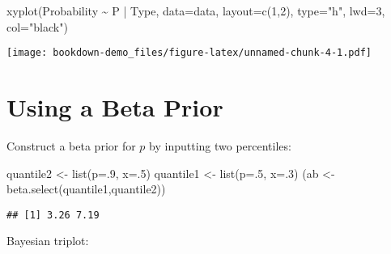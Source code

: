\documentclass[
]{book}
\newenvironment{Shaded}{\begin{snugshade}}{\end{snugshade}}
\newcommand{\AttributeTok}[1]{\textcolor[rgb]{0.77,0.63,0.00}{#1}}
\newcommand{\DecValTok}[1]{\textcolor[rgb]{0.00,0.00,0.81}{#1}}
\newcommand{\FunctionTok}[1]{\textcolor[rgb]{0.00,0.00,0.00}{#1}}
\newcommand{\NormalTok}[1]{#1}
\newcommand{\OtherTok}[1]{\textcolor[rgb]{0.56,0.35,0.01}{#1}}
\newcommand{\SpecialCharTok}[1]{\textcolor[rgb]{0.00,0.00,0.00}{#1}}
\newcommand{\StringTok}[1]{\textcolor[rgb]{0.31,0.60,0.02}{#1}}
\begin{document}
\begin{Shaded}
\begin{Highlighting}[]
\FunctionTok{xyplot}\NormalTok{(Probability }\SpecialCharTok{\textasciitilde{}}\NormalTok{ P }\SpecialCharTok{|}\NormalTok{ Type, }\AttributeTok{data=}\NormalTok{data, }
       \AttributeTok{layout=}\FunctionTok{c}\NormalTok{(}\DecValTok{1}\NormalTok{,}\DecValTok{2}\NormalTok{), }\AttributeTok{type=}\StringTok{"h"}\NormalTok{, }\AttributeTok{lwd=}\DecValTok{3}\NormalTok{, }\AttributeTok{col=}\StringTok{"black"}\NormalTok{)}
\end{Highlighting}
\end{Shaded}

\texttt{[image: bookdown-demo\_files/figure-latex/unnamed-chunk-4-1.pdf]}

\hypertarget{using-a-beta-prior}{%
\section{Using a Beta Prior}\label{using-a-beta-prior}}

Construct a beta prior for \(p\) by inputting two percentiles:

\begin{Shaded}
\begin{Highlighting}[]
\NormalTok{quantile2 }\OtherTok{\textless{}{-}} \FunctionTok{list}\NormalTok{(}\AttributeTok{p=}\NormalTok{.}\DecValTok{9}\NormalTok{, }\AttributeTok{x=}\NormalTok{.}\DecValTok{5}\NormalTok{)}
\NormalTok{quantile1 }\OtherTok{\textless{}{-}} \FunctionTok{list}\NormalTok{(}\AttributeTok{p=}\NormalTok{.}\DecValTok{5}\NormalTok{, }\AttributeTok{x=}\NormalTok{.}\DecValTok{3}\NormalTok{)}
\NormalTok{(ab }\OtherTok{\textless{}{-}} \FunctionTok{beta.select}\NormalTok{(quantile1,quantile2))}
\end{Highlighting}
\end{Shaded}

\begin{verbatim}
## [1] 3.26 7.19
\end{verbatim}

Bayesian triplot:
\end{document}
